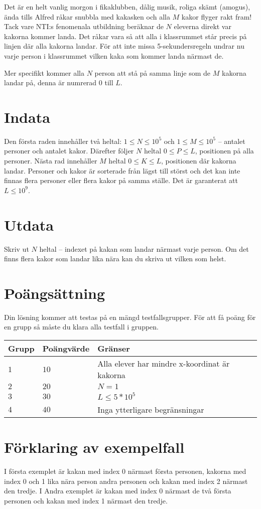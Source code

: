 Det är en helt vanlig morgon i fikaklubben, dålig musik, roliga skämt (amogus), ända tills Alfred råkar snubbla med kakasken och alla $M$ kakor flyger rakt fram!
Tack vare NTI:s fenomenala utbildning beräknar de $N$ eleverna direkt var kakorna kommer landa. Det råkar vara så att alla i klassrummet står precis på linjen där alla kakorna landar.
För att inte missa 5-sekundersregeln undrar nu varje person i klassrummet vilken kaka som kommer landa närmast de. 

Mer specifikt kommer alla $N$ person att stå på samma linje som de $M$ kakorna landar på, denna är numrerad 0 till $L$.


\section*{Indata}
Den första raden innehåller två heltal: $1\leq N \leq 10^5$ och $1 \leq M \leq 10^5$ -- antalet personer och antalet kakor. 
Därefter följer $N$ heltal $0 \leq P \leq L$, positionen på alla personer.
Nästa rad innehåller $M$ heltal $0 \leq K \leq L$, positionen där kakorna landar.
Personer och kakor är sorterade från lägst till störst och det kan inte finnas flera personer eller flera kakor på samma ställe.
Det är garanterat att $L \leq 10^9$.

\section*{Utdata}
Skriv ut $N$ heltal -- indexet på kakan som landar närmast varje person. Om det finns flera kakor som landar lika nära kan du skriva ut vilken som helst.

\section*{Poängsättning}
Din lösning kommer att testas på en mängd testfallsgrupper.
För att få poäng för en grupp så måste du klara alla testfall i gruppen.

\noindent
\begin{tabular}{| l | l | p{12cm} |}
  \hline
  Grupp & Poängvärde & Gränser \\ \hline
  $1$   & $10$       & Alla elever har mindre x-koordinat är kakorna \\ \hline
  $2$   & $20$       & $N=1$ \\ \hline
  $3$   & $30$       & $L \leq 5*10^5$ \\ \hline
  $4$   & $40$       & Inga ytterligare begränsningar  \\ \hline
\end{tabular}

\section*{Förklaring av exempelfall}
I första exemplet är kakan med index 0 närmast första personen, kakorna med index 0 och 1 lika nära person andra personen och kakan med index 2 närmast den tredje.
I Andra exemplet är kakan med index 0 närmast de två första personen och kakan med index 1 närmast den tredje.